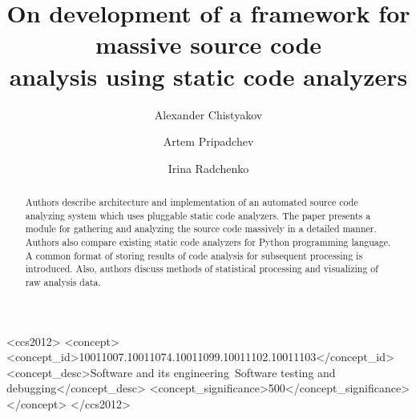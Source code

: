 \documentclass[sigconf]{acmart}
\begin{document}
\title{On development of a framework for massive source code \\analysis 
using static code analyzers}

\author{Alexander Chistyakov}

\author{Artem Pripadchev}

\author{Irina Radchenko}

\renewcommand{\shortauthors}{A. Chistyakov et al.}


\begin{abstract}
Authors describe architecture and implementation of an automated source code analyzing system which uses pluggable static code analyzers. The paper presents a module for gathering and analyzing the source code massively in a detailed manner.
Authors also compare existing static code analyzers for Python programming language. A common format of storing results of code analysis for subsequent processing is introduced. Also, authors discuss methods of statistical processing and visualizing of raw analysis data.
\end{abstract}

%
%
\begin{CCSXML}
<ccs2012>
<concept>
<concept_id>10011007.10011074.10011099.10011102.10011103</concept_id>
<concept_desc>Software and its engineering~Software testing and debugging</concept_desc>
<concept_significance>500</concept_significance>
</concept>
</ccs2012>
\end{CCSXML}




\maketitle




 
\end{document}
